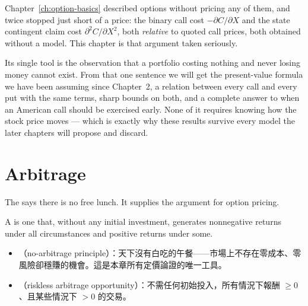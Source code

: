 \bigskip

\suppstart
\noindent Chapter~\ref{ch:option-basics} described options without pricing any of them, and twice stopped just short of a price: the binary call cost $-\partial C/\partial X$ and the state contingent claim cost $\partial^{2}C/\partial X^{2}$, both \emph{relative} to quoted call prices, both obtained without a model.
This chapter is that argument taken seriously.

Its single tool is the observation that a portfolio costing nothing and never losing money cannot exist.
From that one sentence we will get the present-value formula we have been assuming since Chapter~2, a relation between every call and every put with the same terms, sharp bounds on both, and a complete answer to when an American call should be exercised early.
None of it requires knowing how the stock price moves --- which is exactly why these results survive every model the later chapters will propose and discard.
\suppend

\section{Arbitrage}
\label{sec:arbitrage}


The  says there is no free lunch.
It supplies the argument for option pricing.

\begin{definition}
	A  is one that, without any initial investment, generates nonnegative returns under all circumstances and positive returns under some.
\end{definition}

\suppstart
\begin{remark}
	\begin{itemize}[nosep]
		\item {}（no-arbitrage principle）：天下沒有白吃的午餐——市場上不存在零成本、零風險卻穩賺的機會。這是本章所有定價論證的唯一工具。
		\item {}（riskless arbitrage opportunity）：不需任何初始投入，所有情況下報酬 $\ge 0$、且某些情況下 $>0$ 的交易。
	\end{itemize}
\end{remark}
\suppend

